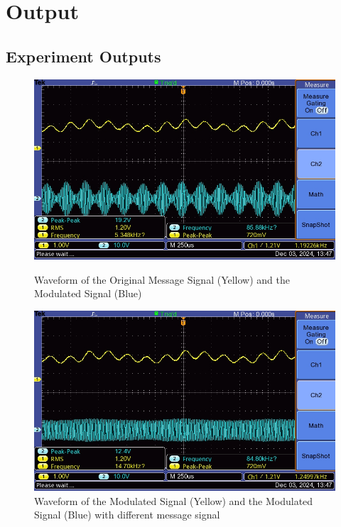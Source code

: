 \documentclass[12pt]{article}
\begin{document}
\section*{Output}

\subsection*{Experiment Outputs}
\begin{figure}[H]
    \centering
    \begin{minipage}{0.45\textwidth}
        \centering
        \includegraphics[width=\textwidth]{Lr1-1-msg-mod.JPG}
        \caption{Waveform of the Original Message Signal (Yellow) and the Modulated Signal (Blue)}
        \label{fig:original_message_signal}
    \end{minipage}
    \hfill
    \begin{minipage}{0.45\textwidth}
        \centering
        \includegraphics[width=\textwidth]{Lr1-4-msg-mod2.JPG}
        \caption{Waveform of the Modulated Signal (Yellow) and the Modulated Signal (Blue) with different message signal}
        \label{fig:modulated_signal}
    \end{minipage}
\end{figure}
\end{document}
